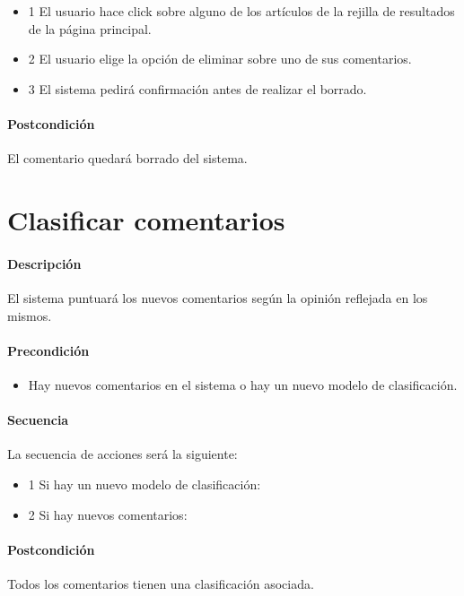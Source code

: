 \begin{itemize}
	\item 1 El usuario hace click sobre alguno de los artículos de la rejilla de resultados de la página principal.
	\item 2 El usuario elige la opción de eliminar sobre uno de sus comentarios.
	\item 3 El sistema pedirá confirmación antes de realizar el borrado.
\end{itemize}
	
\paragraph{Postcondición} El comentario quedará borrado del sistema.

\section{Clasificar comentarios}

\paragraph{Descripción} El sistema puntuará los nuevos comentarios según la opinión reflejada en los mismos.

\paragraph{Precondición} 
\begin{itemize}
	\item Hay nuevos comentarios en el sistema o hay un nuevo modelo de clasificación.
\end{itemize}

\paragraph{Secuencia} La secuencia de acciones será la siguiente:

\begin{itemize}
	\item 1 Si hay un nuevo modelo de clasificación:
	\item 2 Si hay nuevos comentarios:
\end{itemize}
	
\paragraph{Postcondición} Todos los comentarios tienen una clasificación asociada.
